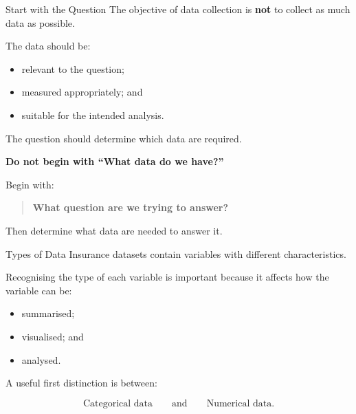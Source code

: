 \documentclass[
  ignorenonframetext,
  aspectratio=169,
]{beamer}
\providecommand{\tightlist}{%
  \setlength{\itemsep}{0pt}\setlength{\parskip}{0pt}}
\begin{document}
\begin{frame}{Start with the Question}
\protect{}\label{start-with-the-question}
The objective of data collection is \textbf{not} to collect as much data
as possible.

The data should be:

\begin{itemize}
\tightlist
\item
  relevant to the question;
\item
  measured appropriately; and
\item
  suitable for the intended analysis.
\end{itemize}

The question should determine which data are required.

\begin{tcolorbox}[enhanced jigsaw, arc=.35mm, bottomrule=.15mm, bottomtitle=1mm, breakable, colback=white, colbacktitle=quarto-callout-note-color!10!white, colframe=quarto-callout-note-color-frame, coltitle=black, left=2mm, leftrule=.75mm, opacityback=0, opacitybacktitle=0.6, rightrule=.15mm, title=\textcolor{quarto-callout-note-color}{\faInfo}\hspace{0.5em}{Start with the question}, titlerule=0mm, toprule=.15mm, toptitle=1mm]

\textbf{Do not begin with ``What data do we have?''}

Begin with:

\begin{quote}
\textbf{What question are we trying to answer?}
\end{quote}

Then determine what data are needed to answer it.

\end{tcolorbox}
\end{frame}

\begin{frame}{Types of Data}
\protect{}\label{types-of-data}
Insurance datasets contain variables with different characteristics.

Recognising the type of each variable is important because it affects
how the variable can be:

\begin{itemize}
\tightlist
\item
  summarised;
\item
  visualised; and
\item
  analysed.
\end{itemize}

A useful first distinction is between:

\[
\boxed{\text{Categorical data}}
\qquad\text{and}\qquad
\boxed{\text{Numerical data}}.
\]
\end{frame}
\end{document}
